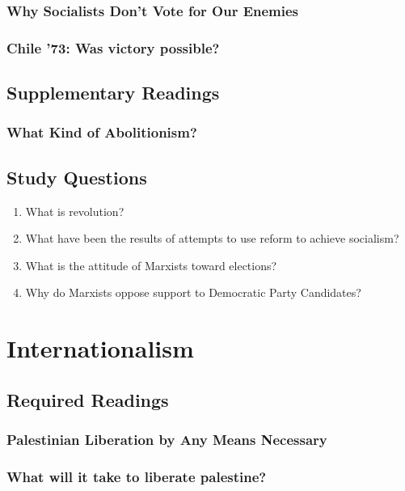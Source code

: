 \documentclass[12pt,a4paper]{report}
\begin{document}
\subsection{Why Socialists Don't Vote for Our Enemies}

\clearpage

\subsection{Chile '73: Was victory possible?}

\clearpage

\section{Supplementary Readings}
\subsection{What Kind of Abolitionism?}

\clearpage

\section{Study Questions}
\begin{enumerate}
	\item What is revolution?
	\item What have been the results of attempts to use reform to achieve socialism?
	\item What is the attitude of Marxists toward elections?
	\item Why do Marxists oppose support to Democratic Party Candidates?
\end{enumerate}
\clearpage

\chapter{Internationalism}
\section{Required Readings}
\subsection{Palestinian Liberation by Any Means Necessary}

\clearpage

\subsection{What will it take to liberate palestine?}

\clearpage
\end{document}
